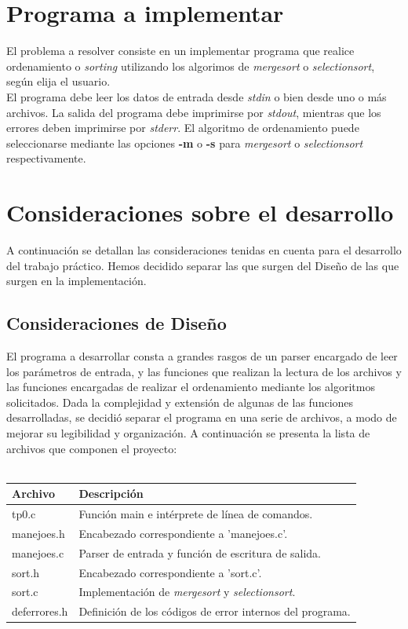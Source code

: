 \documentclass[a4paper,10pt]{article}
\begin{document}
\section{Programa a implementar}
El problema a resolver consiste en un implementar programa que realice ordenamiento o \textit{sorting} utilizando los algorimos de \textit{mergesort} o \textit{selectionsort}, seg\'un elija el usuario.\\

El programa debe leer los datos de entrada desde \textit{stdin} o bien desde uno o m\'as archivos. La salida del programa debe imprimirse por \textit{stdout}, mientras que los errores deben imprimirse por \textit{stderr}. El algoritmo de ordenamiento puede seleccionarse mediante las opciones \textbf{-m} o \textbf{-s} para \textit{mergesort} o \textit{selectionsort} respectivamente.

\section{Consideraciones sobre el desarrollo}
A continuaci\'on se detallan las consideraciones tenidas en cuenta para el desarrollo del trabajo pr\'actico. Hemos decidido separar las que surgen del Dise\~no de las que surgen en la implementaci\'on.

\subsection{Consideraciones de Dise\~no}

El programa a desarrollar consta a grandes rasgos de un parser encargado de leer los par\'ametros de entrada, y las funciones que realizan la lectura de los archivos y las funciones encargadas de realizar el ordenamiento mediante los algoritmos solicitados. Dada la complejidad y extensi\'on de algunas de las funciones desarrolladas, se decidi\'o separar el programa en una serie de archivos, a modo de mejorar su legibilidad y organizaci\'on. A continuaci\'on se presenta la lista de archivos que componen el proyecto:\\
\\
\begin{tabular}{|l|l|}
\hline
Archivo & Descripci\'on \\ \hline
tp0.c & Funci\'on main e int\'erprete de l\'inea de comandos. \\
manejoes.h & Encabezado correspondiente a 'manejoes.c'. \\
manejoes.c & Parser de entrada y funci\'on de escritura de salida. \\
sort.h & Encabezado correspondiente a 'sort.c'. \\
sort.c & Implementaci\'on de \textit{mergesort} y \textit{selectionsort}. \\
deferrores.h & Definici\'on de los c\'odigos de error internos del programa. \\
\hline
\end{tabular}\\
\\\\
\end{document}
